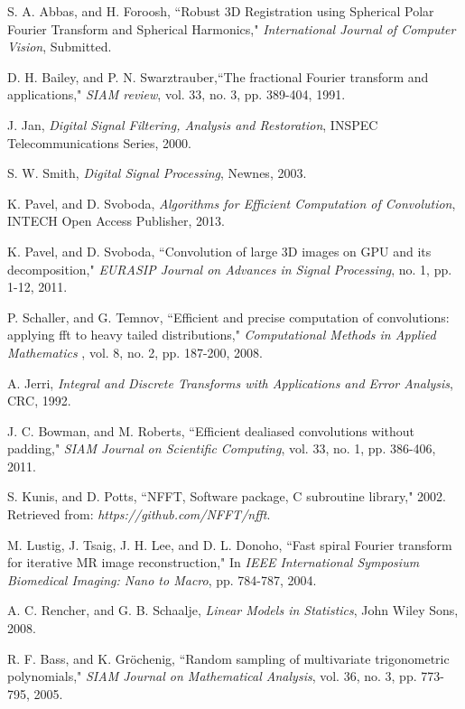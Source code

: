 \documentclass{UCF_ETD}
\begin{document}
\begin{thebibliography}{99}
S. A. Abbas, and H. Foroosh, ``Robust 3D Registration using Spherical Polar Fourier Transform and Spherical Harmonics," \emph{International Journal of Computer Vision}, Submitted.

D. H. Bailey, and P. N. Swarztrauber,``The fractional Fourier transform and applications," \emph{SIAM review}, vol. 33, no. 3, pp. 389-404, 1991.

J. Jan, \emph{Digital Signal Filtering, Analysis and Restoration},  INSPEC Telecommunications Series, 2000.

S. W. Smith, \emph{Digital Signal Processing}, Newnes, 2003.

K. Pavel, and D. Svoboda, \emph{Algorithms for Efficient Computation of Convolution}, INTECH Open Access Publisher, 2013.

K. Pavel, and D. Svoboda, ``Convolution of large 3D images on GPU and its decomposition," \emph{EURASIP Journal on Advances in Signal Processing},  no. 1, pp. 1-12, 2011.

P. Schaller, and G. Temnov, ``Efficient and precise computation of convolutions: applying fft to heavy tailed distributions," \emph{Computational Methods in Applied Mathematics }, vol. 8, no. 2, pp. 187-200, 2008.

A. Jerri, \emph{Integral and Discrete Transforms with Applications and Error Analysis}, CRC, 1992.

J. C. Bowman, and M. Roberts, ``Efficient dealiased convolutions without padding," \emph{SIAM Journal on Scientific Computing}, vol. 33, no. 1, pp. 386-406, 2011.

S. Kunis, and D. Potts, ``NFFT, Software package, C subroutine library," 2002. Retrieved from: \emph{https://github.com/NFFT/nfft}.

M. Lustig, J. Tsaig, J. H. Lee, and D. L. Donoho, ``Fast spiral Fourier transform for iterative MR image reconstruction," In \emph{IEEE International Symposium Biomedical Imaging: Nano to Macro}, pp. 784-787, 2004.

A. C. Rencher, and G. B. Schaalje, \emph{Linear Models in Statistics}, John Wiley Sons, 2008.

R. F. Bass, and K. Gröchenig, ``Random sampling of multivariate trigonometric polynomials,"  \emph{SIAM Journal on Mathematical Analysis}, vol. 36, no. 3, pp. 773-795, 2005.


\end{thebibliography}
\end{document}
